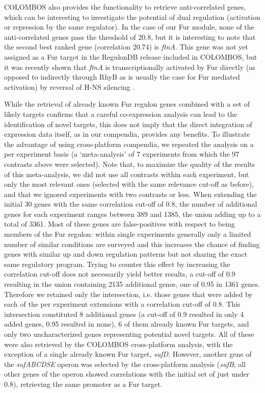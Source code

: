 COLOMBOS also provides the functionality to retrieve anti-correlated genes, 
which can be interesting to investigate the potential of dual regulation 
(activation or repression by the same regulator). In the case of our Fur 
module, none of the anti-correlated genes pass the threshold of 20.8, but it is 
interesting to note that the second best ranked gene (correlation 20.74) is 
{\it ftnA}. This gene was not yet assigned as a Fur target in the RegulonDB 
release included in COLOMBOS, but it was recently shown that {\it ftnA} is 
transcriptionally activated by Fur directly (as opposed to indirectly through 
RhyB as is usually the case for Fur mediated activation) by reversal of H-NS 
silencing \cite{Nandal2010}.

While the retrieval of already known Fur regulon genes combined with a set of likely targets confirms that a careful co-expression analysis can lead to the identification of novel targets, this does not imply that the direct integration of expression data itself, as in our compendia, provides any benefits. To illustrate the advantage of using cross-platform compendia, we repeated the analysis on a per experiment basis (a `meta-analysis' of 7 experiments from which the 97 contrasts above were selected). Note that, to maximize the quality of the results of this meta-analysis, we did not use all contrasts within each experiment, but only the most relevant ones (selected with the same relevance cut-off as before), and that we ignored experiments with two contrasts or less. When extending the initial 30 genes with the same correlation cut-off of 0.8, the number of additional genes for each experiment ranges between 389 and 1385, the union adding up to a total of 3361. Most of these genes are false-positives with respect to being members of the Fur regulon: within single experiments generally only a limited number of similar conditions are surveyed and this increases the chance of finding genes with similar up and down regulation patterns but not sharing the exact same regulatory program. Trying to counter this effect by increasing the correlation cut-off does not necessarily yield better results, a cut-off of 0.9 resulting in the union containing 2135 additional genes, one of 0.95 in 1361 genes. Therefore we retained only the intersection, i.e. those genes that were added by each of the per experiment extensions with a correlation cut-off of 0.8. This intersection constituted 8 additional genes (a cut-off of 0.9 resulted in only 4 added genes, 0.95 resulted in none), 6 of them already known Fur targets, and only two uncharacterized genes representing potential novel targets. All of these were also retrieved by the COLOMBOS cross-platform analysis, with the exception of a single already known Fur target, {\it sufD}. However, another gene of the {\it sufABCDSE} operon was selected by the cross-platform analysis ({\it sufB}; all other genes of the operon showed correlations with the initial set of just under 0.8), retrieving the same promoter as a Fur target.



